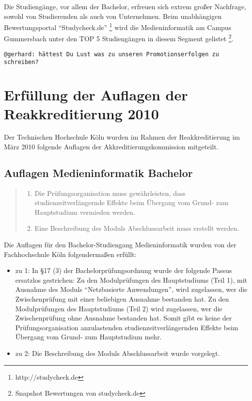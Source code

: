 Die Studiengänge, vor allem der Bachelor, erfreuen sich extrem großer
Nachfrage, sowohl von Studierenden als auch von Unternehmen. Beim
unabhängigen Bewertungsportal ``Studycheck.de'' \footnote{http://studycheck.de}
wird die Medieninformatik am Campus Gummersbach unter den TOP 5
Studiengängen in diesem Segment gelistet \footnote{Snapshot Bewertungen
  von studycheck.de}.

\begin{verbatim}
@gerhard: hättest Du Lust was zu unseren Promotionserfolgen zu schreiben?
\end{verbatim}

\section{Erfüllung der Auflagen der Reakkreditierung
2010}\label{erfuxfcllung-der-auflagen-der-reakkreditierung-2010}

Der Technischen Hochschule Köln wurden im Rahmen der Reakkreditierung im
März 2010 folgende Auflagen der Akkreditierungskommission mitgeteilt.

\subsection{Auflagen Medieninformatik
Bachelor}\label{auflagen-medieninformatik-bachelor}

\begin{quote}
\begin{enumerate}
\def\labelenumi{\arabic{enumi}.}
\tightlist
\item
  Die Prüfungsorganisation muss gewährleisten, dass
  studienzeitverlängernde Effekte beim Übergang vom Grund- zum
  Hauptstudium vermieden werden.
\item
  Eine Beschreibung des Moduls Abschlussarbeit muss erstellt werden.
\end{enumerate}
\end{quote}

Die Auflagen für den Bachelor-Studiengang Medieninformatik wurden von
der Fachhochschule Köln folgendermaßen erfüllt:

\begin{itemize}
\tightlist
\item
  zu 1: In §17 (3) der Bachelorprüfungsordnung wurde der folgende Passus
  ersatzlos gestrichen: Zu den Modulprüfungen des Hauptstudiums (Teil
  1), mit Ausnahme des Moduls ``Netzbasierte Anwendungen'', wird
  zugelassen, wer die Zwischenprüfung mit einer beliebigen Ausnahme
  bestanden hat. Zu den Modulprüfungen des Hauptstudiums (Teil 2) wird
  zugelassen, wer die Zwischenprüfung ohne Ausnahme bestanden hat. Somit
  gibt es keine der Prüfungsorganisation anzulastenden
  studienzeitverlängernden Effekte beim Übergang vom Grund- zum
  Hauptstudium mehr.
\item
  zu 2: Die Beschreibung des Moduls Abschlussarbeit wurde vorgelegt.
\end{itemize}

